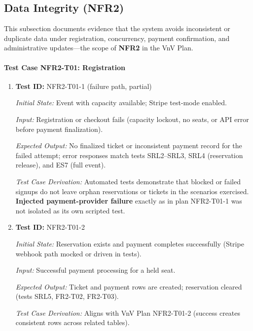 \documentclass[12pt, titlepage]{article}
\begin{document}
\subsection{Data Integrity (NFR2)}

This subsection documents evidence that the system avoids inconsistent or duplicate data under registration, concurrency, payment confirmation, and administrative updates---the scope of \textbf{NFR2} in the VnV Plan.

\paragraph{Test Case NFR2-T01: Registration}

\begin{enumerate}

\item \textbf{Test ID:} NFR2-T01-1 (failure path, partial)

\textit{Initial State:} Event with capacity available; Stripe test-mode enabled.

\textit{Input:} Registration or checkout fails (capacity lockout, no seats, or API error before payment finalization).

\textit{Expected Output:} No finalized ticket or inconsistent payment record for the failed attempt; error responses match tests SRL2--SRL3, SRL4 (reservation release), and ES7 (full event).

\textit{Test Case Derivation:} Automated tests demonstrate that blocked or failed signups do not leave orphan reservations or tickets in the scenarios exercised. \textbf{Injected payment-provider failure} exactly as in plan NFR2-T01-1 was not isolated as its own scripted test.

\item \textbf{Test ID:} NFR2-T01-2

\textit{Initial State:} Reservation exists and payment completes successfully (Stripe webhook path mocked or driven in tests).

\textit{Input:} Successful payment processing for a held seat.

\textit{Expected Output:} Ticket and payment rows are created; reservation cleared (tests SRL5, FR2-T02, FR2-T03).

\textit{Test Case Derivation:} Aligns with VnV Plan NFR2-T01-2 (success creates consistent rows across related tables).

\end{enumerate}
\end{document}
